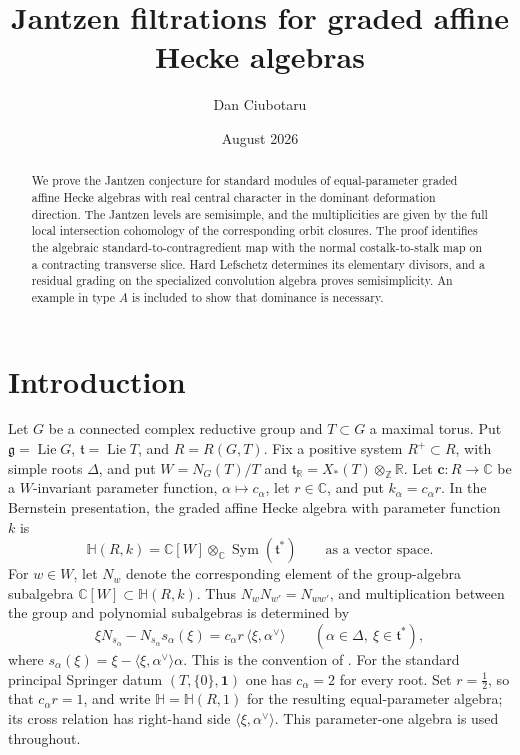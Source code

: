 \documentclass[11pt]{amsart}
\title{Jantzen filtrations for graded affine Hecke algebras}
\author{Dan Ciubotaru}
\date{August 2026}
\theoremstyle{definition}
\theoremstyle{remark}
\newcommand{\Hh}{\mathbb H}
\begin{document}
\raggedbottom
\begin{abstract}
We prove the Jantzen conjecture for standard modules of equal-parameter
graded affine Hecke algebras with real central character in the dominant
deformation direction.  The Jantzen levels are semisimple, and the
multiplicities are given by the full local intersection cohomology of the
corresponding orbit closures.  The proof identifies the algebraic
standard-to-contragredient map with the normal costalk-to-stalk map
on a contracting transverse slice.  Hard Lefschetz determines its
elementary divisors, and a residual grading on the specialized convolution
algebra proves semisimplicity.  An example in type $A$ is included to show that dominance is necessary.
\end{abstract}

\maketitle

\section{Introduction}

Let $G$ be a connected complex reductive group and $T\subset G$ a maximal
torus.  Put $\mathfrak g=\operatorname{Lie}G$,
$\mathfrak t=\operatorname{Lie}T$, and $R=R(G,T)$.  %
Fix a positive system $R^+\subset R$, with simple roots $\Delta$, and put
$W=N_G(T)/T$ and
$\mathfrak t_{\mathbb R}=X_*(T)\otimes_{\mathbb Z}\mathbb R$.  Let
$\mathbf c:R\to\mathbb C$ be a $W$-invariant parameter function,
$\alpha\mapsto c_\alpha$, let $r\in\mathbb C$, and put
$k_\alpha=c_\alpha r$.  In the Bernstein presentation, the graded affine
Hecke algebra with parameter function $k$ is
\[
 \Hh(R,k)=
 \mathbb C[W]\otimes_{\mathbb C}\operatorname{Sym}(\mathfrak t^*)
 \qquad\text{as a vector space}.
\]
For $w\in W$, let $N_w$ denote the corresponding element of the group-algebra
subalgebra $\mathbb C[W]\subset\Hh(R,k)$.  Thus
$N_wN_{w'}=N_{ww'}$, and multiplication between the group and polynomial
subalgebras is determined by
\[
 \xi N_{s_\alpha}-N_{s_\alpha}s_\alpha(\xi)
 =c_\alpha r\,\langle\xi,\alpha^\vee\rangle
 \qquad(\alpha\in\Delta,\ \xi\in\mathfrak t^*),
\]
where
$s_\alpha(\xi)=\xi-\langle\xi,\alpha^\vee\rangle\alpha$.
This is the convention of
\cite[Section~2, equation~(4)]{SolleveldInduced}.  For the standard principal
Springer datum $(T,\{0\},\mathbf 1)$ one has $c_\alpha=2$ for every root.
Set $r=\tfrac12$, so that $c_\alpha r=1$, and write
$\Hh=\Hh(R,1)$ for the resulting equal-parameter algebra; its cross relation
has right-hand side $\langle\xi,\alpha^\vee\rangle$.  This parameter-one
algebra is used throughout.
\end{document}
